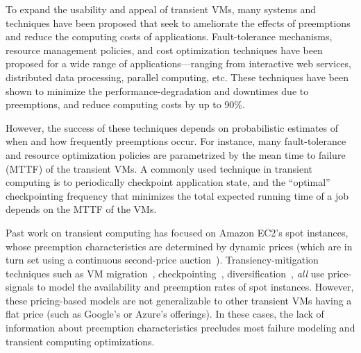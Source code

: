 To expand the usability and appeal of transient VMs, many systems and techniques have been proposed that seek to ameliorate the effects of preemptions and reduce the computing costs of applications. 
%
Fault-tolerance mechanisms, resource management policies, and cost optimization techniques have been proposed for a wide range of applications---ranging from interactive web services, distributed data processing, parallel computing, etc.
%
These techniques have been shown to minimize the performance-degradation and downtimes due to preemptions, and reduce computing costs by up to 90\%. 


However, the success of these techniques depends on probabilistic estimates of when and how frequently preemptions occur. 
For instance, many fault-tolerance and resource optimization policies are parametrized by the mean time to failure (MTTF) of the transient VMs. 
A commonly used technique in transient computing is 
to periodically checkpoint application state, and the ``optimal'' checkpointing frequency that minimizes the total expected running time of a job depends on the MTTF of the VMs. 






Past work on transient computing has focused on Amazon EC2's spot instances, whose preemption characteristics are determined by dynamic prices (which are in turn set using a continuous second-price auction~\cite{ben-yehuda}). 
Transiency-mitigation techniques such as VM migration~\cite{spotcheck}, checkpointing~\cite{flint, marathe2014exploiting}, diversification~\cite{exosphere}, \emph{all} use price-signals to model the availability and preemption rates of spot instances. 
However, these pricing-based models are not generalizable to other transient VMs having a flat price (such as Google's or Azure's offerings). 
In these cases, the lack of information about preemption characteristics precludes most failure modeling and transient computing optimizations. 


